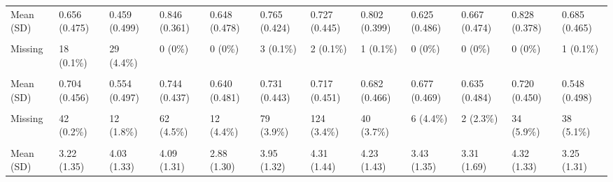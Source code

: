 \documentclass[
  single column]{article}
\begin{document}
\begin{landscape}
\begin{longtable}[t]{llllllllllll}
\addlinespace
Mean (SD) & 0.656 (0.475) & 0.459 (0.499) & 0.846 (0.361) & 0.648 (0.478) & 0.765 (0.424) & 0.727 (0.445) & 0.802 (0.399) & 0.625 (0.486) & 0.667 (0.474) & 0.828 (0.378) & 0.685 (0.465)\\
\cellcolor{gray!10}{Median [Min, Max]} & \cellcolor{gray!10}{1.00 [0, 1.00]} & \cellcolor{gray!10}{0 [0, 1.00]} & \cellcolor{gray!10}{1.00 [0, 1.00]} & \cellcolor{gray!10}{1.00 [0, 1.00]} & \cellcolor{gray!10}{1.00 [0, 1.00]} & \cellcolor{gray!10}{1.00 [0, 1.00]} & \cellcolor{gray!10}{1.00 [0, 1.00]} & \cellcolor{gray!10}{1.00 [0, 1.00]} & \cellcolor{gray!10}{1.00 [0, 1.00]} & \cellcolor{gray!10}{1.00 [0, 1.00]} & \cellcolor{gray!10}{1.00 [0, 1.00]}\\
Missing & 18 (0.1\%) & 29 (4.4\%) & 0 (0\%) & 0 (0\%) & 3 (0.1\%) & 2 (0.1\%) & 1 (0.1\%) & 0 (0\%) & 0 (0\%) & 0 (0\%) & 1 (0.1\%)\\
\cellcolor{gray!10}{Partnership Status (Yes/No)} & \cellcolor{gray!10}{} & \cellcolor{gray!10}{} & \cellcolor{gray!10}{} & \cellcolor{gray!10}{} & \cellcolor{gray!10}{} & \cellcolor{gray!10}{} & \cellcolor{gray!10}{} & \cellcolor{gray!10}{} & \cellcolor{gray!10}{} & \cellcolor{gray!10}{} & \cellcolor{gray!10}{}\\
Mean (SD) & 0.704 (0.456) & 0.554 (0.497) & 0.744 (0.437) & 0.640 (0.481) & 0.731 (0.443) & 0.717 (0.451) & 0.682 (0.466) & 0.677 (0.469) & 0.635 (0.484) & 0.720 (0.450) & 0.548 (0.498)\\
\addlinespace
\cellcolor{gray!10}{Median [Min, Max]} & \cellcolor{gray!10}{1.00 [0, 1.00]} & \cellcolor{gray!10}{1.00 [0, 1.00]} & \cellcolor{gray!10}{1.00 [0, 1.00]} & \cellcolor{gray!10}{1.00 [0, 1.00]} & \cellcolor{gray!10}{1.00 [0, 1.00]} & \cellcolor{gray!10}{1.00 [0, 1.00]} & \cellcolor{gray!10}{1.00 [0, 1.00]} & \cellcolor{gray!10}{1.00 [0, 1.00]} & \cellcolor{gray!10}{1.00 [0, 1.00]} & \cellcolor{gray!10}{1.00 [0, 1.00]} & \cellcolor{gray!10}{1.00 [0, 1.00]}\\
Missing & 42 (0.2\%) & 12 (1.8\%) & 62 (4.5\%) & 12 (4.4\%) & 79 (3.9\%) & 124 (3.4\%) & 40 (3.7\%) & 6 (4.4\%) & 2 (2.3\%) & 34 (5.9\%) & 38 (5.1\%)\\
\cellcolor{gray!10}{Political Conservatism Level} & \cellcolor{gray!10}{} & \cellcolor{gray!10}{} & \cellcolor{gray!10}{} & \cellcolor{gray!10}{} & \cellcolor{gray!10}{} & \cellcolor{gray!10}{} & \cellcolor{gray!10}{} & \cellcolor{gray!10}{} & \cellcolor{gray!10}{} & \cellcolor{gray!10}{} & \cellcolor{gray!10}{}\\
Mean (SD) & 3.22 (1.35) & 4.03 (1.33) & 4.09 (1.31) & 2.88 (1.30) & 3.95 (1.32) & 4.31 (1.44) & 4.23 (1.43) & 3.43 (1.35) & 3.31 (1.69) & 4.32 (1.33) & 3.25 (1.31)\\

\end{longtable}
\end{landscape}
\end{document}
